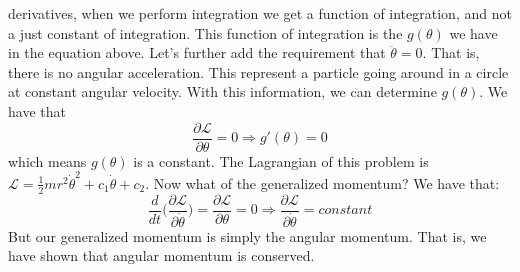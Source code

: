 \documentclass[crop=false,class=article,oneside]{standalone}
\begin{document}
    derivatives, when we perform integration we get a function
    of integration, and not a just constant of integration.
    This function of integration is the $g(\theta)$
    we have in the equation above. Let's further add the
    requirement that $\ddot{\theta}=0$. That is,
    there is no angular acceleration.
    This represent a particle going around in a circle at
    constant angular velocity. With this information,
    we can determine $g(\theta)$. We have that
    \begin{equation*}
        \frac{\partial\mathcal{L}}{\partial\theta}
        =0
        \Rightarrow
        g'(\theta)=0
    \end{equation*}
    which means $g(\theta)$ is a constant. The Lagrangian of
    this problem is
    $\mathcal{L}%
     =\frac{1}{2}mr^{2}\dot{\theta}^{2}%
     +c_{1}\dot{\theta}+c_{2}$.
    Now what of the generalized momentum? We have that:
    \begin{equation*}
        \frac{d}{dt}\big(
            \frac{\partial\mathcal{L}}{\partial\dot{\theta}}
         \big)
        =\frac{\partial\mathcal{L}}{\partial\theta}=0
        \Rightarrow
        \frac{\partial\mathcal{L}}{\partial\dot{\theta}}
        =constant
    \end{equation*}
    But our generalized momentum is simply the
    angular momentum. That is, we have shown
    that angular momentum is conserved.
\end{document}

